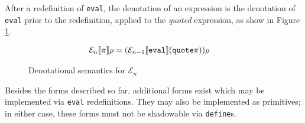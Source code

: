 After a redefinition of \texttt{eval}, the denotation of an expression is the
denotation of \texttt{eval} prior to the redefinition, applied to the
\textit{quoted} expression, as show in Figure \ref{f:denotationalsemn}.

\begin{figure}[H]
\begin{align*}
  \mathcal{E}_{n} \llbracket \pi \rrbracket \rho &= (\mathcal{E}_{n-1} \llbracket \text{\texttt{eval}} \rrbracket  (\text{\texttt{quote}} \pi))\rho 
\end{align*}
\caption{Denotational semantics for $\mathcal{E}_{n}$}
\label{f:denotationalsemn}
\end{figure}

Besides the forms described so far, additional forms exist which may be
implemented via \texttt{eval} redefinitions. They may also be implemented as
primitives; in either case, these forms must not be shadowable via
\texttt{define}s.
